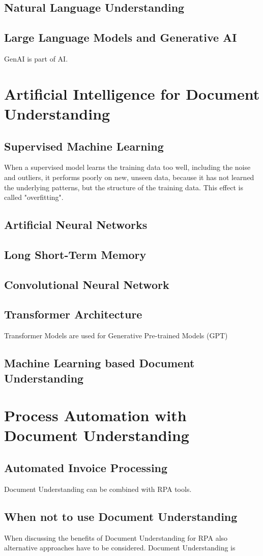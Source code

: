\subsection{Natural Language Understanding}
\subsection{Large Language Models and Generative AI}
\ac{GenAI} is part of \ac{AI}.
\section{Artificial Intelligence for Document Understanding}
\subsection{Supervised Machine Learning}

When a supervised model learns the training data too well, including the noise and outliers, it performs poorly on new, unseen data, because it has not learned the underlying patterns, but the structure of the training data. This effect is called "overfitting".
\subsection{Artificial Neural Networks}
\subsection{Long Short-Term Memory}
\subsection{Convolutional Neural Network}
\subsection{Transformer Architecture}
Transformer Models are used for Generative Pre-trained Models (GPT)
\subsection{Machine Learning based Document Understanding}
\section{Process Automation with Document Understanding}
\subsection{Automated Invoice Processing}
Document Understanding can be combined with \ac{RPA} tools.
\subsection{When not to use Document Understanding}
When discussing the benefits of Document Understanding for \ac{RPA} also alternative approaches have to be considered. Document Understanding is 